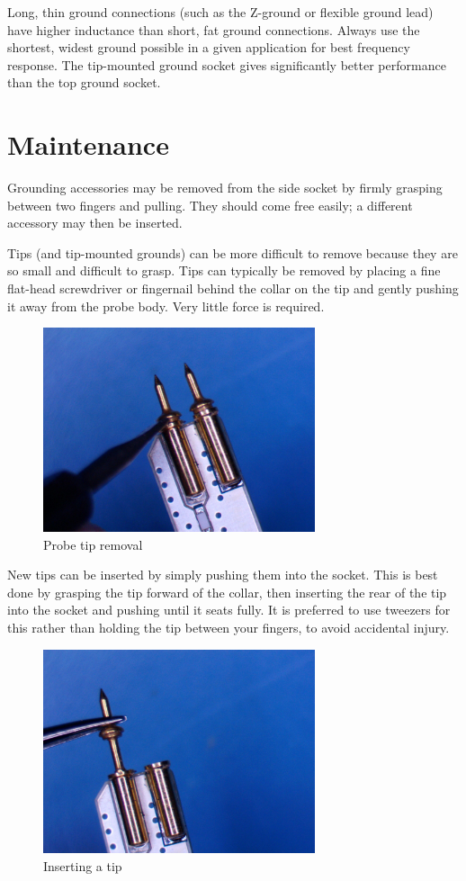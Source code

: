 \documentclass[11pt]{article}
\begin{document}
Long, thin ground connections (such as the Z-ground or flexible ground lead) have higher inductance than short, fat
ground connections. Always use the shortest, widest ground possible in a given application for best frequency response.
The tip-mounted ground socket gives significantly better performance than the top ground socket.

\section{Maintenance}

Grounding accessories may be removed from the side socket by firmly grasping between two fingers and pulling. They
should come free easily; a different accessory may then be inserted.

Tips (and tip-mounted grounds) can be more difficult to remove because they are so small and difficult to grasp. Tips
can typically be removed by placing a fine flat-head screwdriver or fingernail behind the collar on the tip and gently
pushing it away from the probe body. Very little force is required.

\begin{figure}[h!]
\centering
\includegraphics[width=8cm]{tip-removal.jpg}
\caption{Probe tip removal}
\end{figure}

New tips can be inserted by simply pushing them into the socket. This is best done by grasping the tip forward of the
collar, then inserting the rear of the tip into the socket and pushing until it seats fully. It is preferred to use
tweezers for this rather than holding the tip between your fingers, to avoid accidental injury.

\begin{figure}[h!]
\centering
\includegraphics[width=8cm]{tip-insertion.jpg}
\caption{Inserting a tip}
\end{figure}
\end{document}
